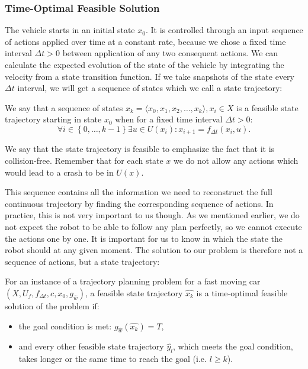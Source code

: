\subsubsection{Time-Optimal Feasible Solution}

The vehicle starts in an initial state $x_0$. It is controlled through an input sequence of actions applied over time at a constant rate, because we chose a fixed time interval $\Delta t>0$ between application of any two consequent actions. We can calculate the expected evolution of the state of the vehicle by integrating the velocity from a state transition function. If we take snapshots of the state every $\Delta t$ interval, we will get a sequence of states which we call a state trajectory:

\begin{defn}
	We say that a sequence of states $\hat{x_k}=\langle x_0,x_1,x_2,…,x_k \rangle ,x_i\in X$ is a feasible state trajectory starting in state $x_0$ when for a fixed time interval $\Delta t>0$:
	\[
	\forall i \in \left\{ 0,\ldots,k-1\right\} \exists u\in U(x_i): x_{i+1}=f_{\Delta t} (x_i,u).
	\]
\end{defn}

We say that the state trajectory is feasible to emphasize the fact that it is collision-free. Remember that for each state $x$ we do not allow any actions which would lead to a crash to be in $U(x)$.

This sequence contains all the information we need to reconstruct the full continuous trajectory by finding the corresponding sequence of actions. In practice, this is not very important to us though. As we mentioned earlier, we do not expect the robot to be able to follow any plan perfectly, so we cannot execute the actions one by one. It is important for us to know in which the state the robot should at any given moment. The solution to our problem is therefore not a sequence of actions, but a state trajectory:

\begin{defn}
	For an instance of a trajectory planning problem for a fast moving car $\left(X, U_f, f_{\Delta t}, c, x_0, g_{\hat{w}}\right)$, a feasible state trajectory $\hat{x_k}$ is a time-optimal feasible solution of the problem if:
	\begin{itemize}
		\item the goal condition is met: $g_{\hat{w}}\left( \hat{x_k} \right) = T$,
		\item and every other feasible state trajectory $\hat{y_l}$, which meets the goal condition, takes longer or the same time to reach the goal (i.e. $l \geq k$).
	\end{itemize}
\end{defn}

